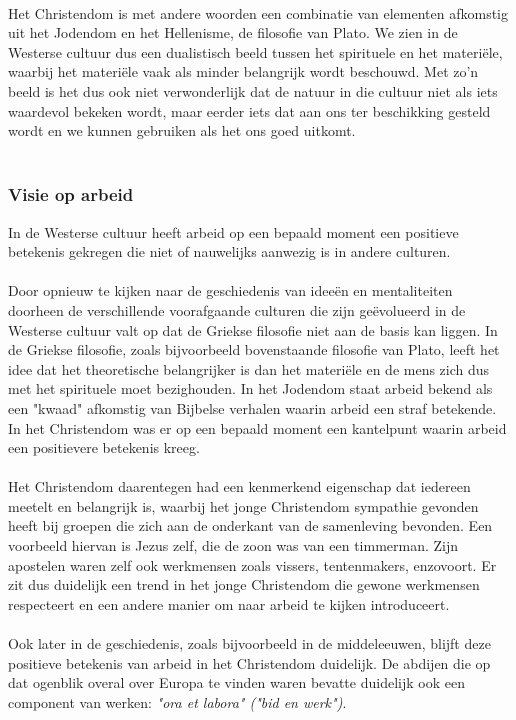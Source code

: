 \documentclass[../summary.tex]{subfiles}
\begin{document}
	\\
	Het Christendom is met andere woorden een combinatie van elementen afkomstig uit het Jodendom en het Hellenisme, de filosofie van Plato. We zien in de Westerse cultuur dus een dualistisch beeld tussen het spirituele en het materiële, waarbij het materiële vaak als minder belangrijk wordt beschouwd. Met zo'n beeld is het dus ook niet verwonderlijk dat de natuur in die cultuur niet als iets waardevol bekeken wordt, maar eerder iets dat aan ons ter beschikking gesteld wordt en we kunnen gebruiken als het ons goed uitkomt.\\
	\\
	\subsubsection{Visie op arbeid}
	In de Westerse cultuur heeft arbeid op een bepaald moment een positieve betekenis gekregen die niet of nauwelijks aanwezig is in andere culturen.\\
	\\
	Door opnieuw te kijken naar de geschiedenis van ideeën en mentaliteiten doorheen de verschillende voorafgaande culturen die zijn geëvolueerd in de Westerse cultuur valt op dat de Griekse filosofie niet aan de basis kan liggen. In de Griekse filosofie, zoals bijvoorbeeld bovenstaande filosofie van Plato, leeft het idee dat het theoretische belangrijker is dan het materiële en de mens zich dus met het spirituele moet bezighouden. In het Jodendom staat arbeid bekend als een "kwaad" afkomstig van Bijbelse verhalen waarin arbeid een straf betekende. In het Christendom was er op een bepaald moment een kantelpunt waarin arbeid een positievere betekenis kreeg. \\
	\\
	Het Christendom daarentegen had een kenmerkend eigenschap dat iedereen meetelt en belangrijk is, waarbij het jonge Christendom sympathie gevonden heeft bij groepen die zich aan de onderkant van de samenleving bevonden. Een voorbeeld hiervan is Jezus zelf, die de zoon was van een timmerman. Zijn apostelen waren zelf ook werkmensen zoals vissers, tentenmakers, enzovoort. Er zit dus duidelijk een trend in het jonge Christendom die gewone werkmensen respecteert en een andere manier om naar arbeid te kijken introduceert.\\
	\\
	Ook later in de geschiedenis, zoals bijvoorbeeld in de middeleeuwen, blijft deze positieve betekenis van arbeid in het Christendom duidelijk. De abdijen die op dat ogenblik overal over Europa te vinden waren bevatte duidelijk ook een component van werken: \textit{"ora et labora" ("bid en werk")}. \\
\end{document}
